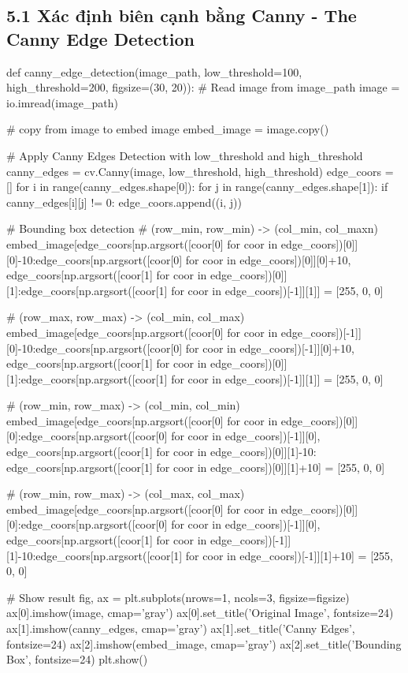 \documentclass{article}
\begin{document}
	\subsection{5.1 Xác định biên cạnh bằng Canny - The Canny Edge Detection}
	\begin{python}
		def canny_edge_detection(image_path, low_threshold=100, high_threshold=200, figsize=(30, 20)):
			# Read image from image_path
			image = io.imread(image_path)
			
			# copy from image to embed image
			embed_image = image.copy()
			
			# Apply Canny Edges Detection with low_threshold and high_threshold
			canny_edges = cv.Canny(image, low_threshold, high_threshold)
			edge_coors = []
			for i in range(canny_edges.shape[0]):
				for j in range(canny_edges.shape[1]):
					if canny_edges[i][j] != 0:
						edge_coors.append((i, j))
			
			# Bounding box detection
			# (row_min, row_min) -> (col_min, col_maxn)
			embed_image[edge_coors[np.argsort([coor[0] for coor in edge_coors])[0]][0]-10:edge_coors[np.argsort([coor[0] for coor in edge_coors])[0]][0]+10, edge_coors[np.argsort([coor[1] for coor in edge_coors])[0]][1]:edge_coors[np.argsort([coor[1] for coor in edge_coors])[-1]][1]] = [255, 0, 0]
			
			# (row_max, row_max) -> (col_min, col_max)
			embed_image[edge_coors[np.argsort([coor[0] for coor in edge_coors])[-1]][0]-10:edge_coors[np.argsort([coor[0] for coor in edge_coors])[-1]][0]+10, edge_coors[np.argsort([coor[1] for coor in edge_coors])[0]][1]:edge_coors[np.argsort([coor[1] for coor in edge_coors])[-1]][1]] = [255, 0, 0]
			
			# (row_min, row_max) -> (col_min, col_min)
			embed_image[edge_coors[np.argsort([coor[0] for coor in edge_coors])[0]][0]:edge_coors[np.argsort([coor[0] for coor in edge_coors])[-1]][0], edge_coors[np.argsort([coor[1] for coor in edge_coors])[0]][1]-10: edge_coors[np.argsort([coor[1] for coor in edge_coors])[0]][1]+10] = [255, 0, 0]
			
			# (row_min, row_max) -> (col_max, col_max)
			embed_image[edge_coors[np.argsort([coor[0] for coor in edge_coors])[0]][0]:edge_coors[np.argsort([coor[0] for coor in edge_coors])[-1]][0], edge_coors[np.argsort([coor[1] for coor in edge_coors])[-1]][1]-10:edge_coors[np.argsort([coor[1] for coor in edge_coors])[-1]][1]+10] = [255, 0, 0]
		
			# Show result
			fig, ax = plt.subplots(nrows=1, ncols=3, figsize=figsize)
			ax[0].imshow(image, cmap='gray')
			ax[0].set_title('Original Image', fontsize=24)
			ax[1].imshow(canny_edges, cmap='gray')
			ax[1].set_title('Canny Edges', fontsize=24)
			ax[2].imshow(embed_image, cmap='gray')
			ax[2].set_title('Bounding Box', fontsize=24)
			plt.show()
	\end{python}
\end{document}
